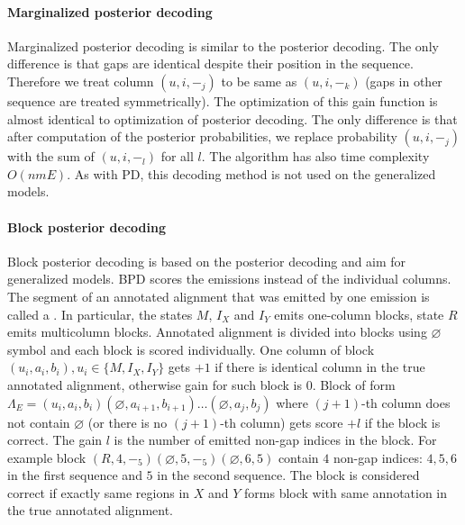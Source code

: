 \paragraph{Marginalized posterior decoding}
Marginalized posterior decoding is similar to the posterior decoding. The only
difference is that gaps are identical despite their position in the sequence.
Therefore we treat column $(u, i, -_j)$ to be same as $(u, i, -_k)$ (gaps in
other sequence are treated symmetrically). The optimization of this gain
function is almost identical to optimization of posterior decoding. The only
difference is that after computation of the posterior probabilities, we replace
probability $(u, i, -_j)$ with the sum of $(u, i, -_l)$ for all $l$. The
algorithm has also time complexity $O(nmE)$.  As with PD, this
decoding method is not used on the generalized models.

\paragraph{Block posterior decoding}
Block posterior decoding is based on the posterior decoding and aim for
generalized models. BPD scores the emissions instead of the individual columns.
The segment of an annotated alignment that was emitted by one emission is
called a . In particular, the states $M$, $I_X$ and $I_Y$
emits one-column blocks, state $R$ emits multicolumn blocks. Annotated
alignment is divided into blocks using $\varnothing$ symbol and each block is
scored individually.  One column of block $(u_i, a_i, b_i), u_i\in\{M, I_X,
I_Y\}$ gets $+1$ if there is identical column in the true annotated alignment,
otherwise gain for such block is $0$. Block of form $\Lambda_E=(u_i, a_i,
b_i)(\varnothing, a_{i+1}, b_{i+1})\dots (\varnothing, a_{j}, b_{j})$ where
$(j+1)$-th column does not contain $\varnothing$ (or there is no $(j+1)$-th
column) gets score $+l$ if the block is correct. The gain $l$ is the number of
emitted non-gap indices in the block. For example block $(R, 4,
-_5)(\varnothing, 5, -_5)(\varnothing, 6, 5)$ contain $4$ non-gap indices: $4,
5, 6$ in the first sequence and $5$ in the second sequence.  The block is
considered correct if exactly same regions in $X$ and $Y$ forms block with same
annotation in the true annotated alignment.

